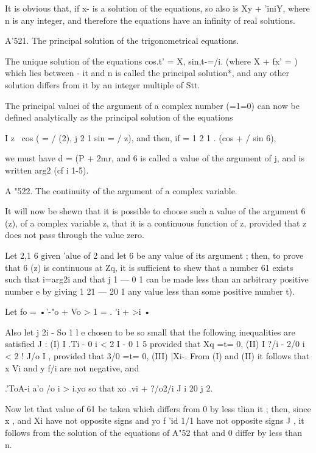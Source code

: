 It is obvious that, if x-  is a solution of the equations, so also is Xy + 'iniY, where n is 
any integer, and therefore the equations have an infinity of real solutions. 

A'521. The principal solution of the trigonometrical equations. 

The unique solution of the equations cos.t' = X, sin,t-=/i. (where X  + fx' = )  which lies 
between - it and n is called the principal solution*, and any other solution differs from it 
by an integer multiple of Stt. 

The principal valuei of the argument of a complex number  (=1=0) can now be defined 
analytically as the principal solution of the equations 

I z \ cos (  = /  (2), j 2 1 sin   = /  z), 
and then, if   = 1 2 1 . (cos   + / sin 6), 

we must have d = (P + 2mr, and 6 is called a value of the argument of j, and is written 
arg2 (cf i  1-5). 

A "522. The continuity of the argument of a complex variable. 

It will now be shewn that it is possible to choose such a value of the argument 6 (z), of 
a complex variable z, that it is a continuous function of z, provided that z does not pass 
through the value zero. 

Let 2,1  6   given  'alue of 2 and let 6  be any value of its argument ; then, to prove that 
6 (z) is continuous at Zq, it is sufficient to shew that a number 61 exists such that  i=arg2i 
and that j  1 —  0 1 can be made less than an arbitrary positive number e by giving 1 21 — 20 1 
any value less than some positive number t). 

Let fo = •'-"o +  Vo >  1 = . 'i +  >i • 

Also let j 2i - So 1 l e chosen to be so small that the following inequalities are satisfied J : 
(I) I .Ti -  0 i < 2 I - 0 1 5 provided that Xq =t= 0, 
(II) I ?/i - 2/0 i < 2 ! J/o I , provided that 3/0 =t= 0, 
(III) |Xi-.%
From (I) and (II) it follows that x Vi and y f/i are not negative, and 

.'ToA-i  a'o   /o i > i.yo  
so that xo .vi + ?/o2/i   J i 20 j 2. 

Now let that value of 61 be taken which differs from  0 by less tlian it ; then, since 
x , and Xi have not opposite signs and yo f 'id 1/1 have not opposite signs J , it follows from 
the solution of the equations of   A"52 that   and  0 differ by less than  n. 

